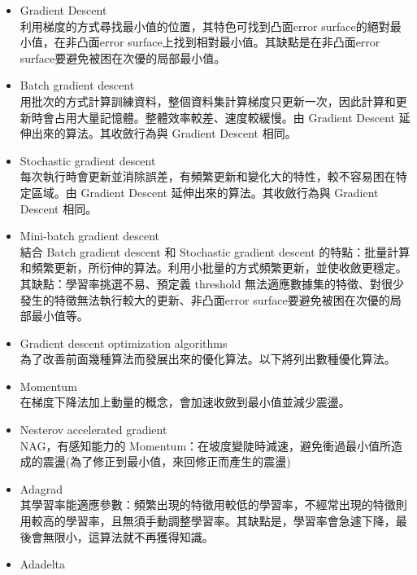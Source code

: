 \documentclass[14pt,a4paper]{report}  %
\begin{document}
\begin{itemize}
\item Gradient Descent\\[6pt]
利用梯度的方式尋找最小值的位置，其特色可找到凸面error surface的絕對最小值，在非凸面error surface上找到相對最小值。其缺點是在非凸面error surface要避免被困在次優的局部最小值。\\
\item Batch gradient descent\\[6pt]
用批次的方式計算訓練資料，整個資料集計算梯度只更新一次，因此計算和更新時會占用大量記憶體。整體效率較差、速度較緩慢。由 Gradient Descent 延伸出來的算法。其收斂行為與 Gradient Descent 相同。\\
\item Stochastic gradient descent\\[6pt]
每次執行時會更新並消除誤差，有頻繁更新和變化大的特性，較不容易困在特定區域。由 Gradient Descent 延伸出來的算法。其收斂行為與 Gradient Descent 相同。\\
\item Mini-batch gradient descent\\[6pt]
結合 Batch gradient descent 和 Stochastic gradient descent 的特點：批量計算和頻繁更新，所衍伸的算法。利用小批量的方式頻繁更新，並使收斂更穩定。其缺點：學習率挑選不易、預定義 threshold 無法適應數據集的特徵、對很少發生的特徵無法執行較大的更新、非凸面error surface要避免被困在次優的局部最小值等。\\
\item Gradient descent optimization algorithms\\[6pt]
為了改善前面幾種算法而發展出來的優化算法。以下將列出數種優化算法。\\
\item Momentum\\[6pt]
在梯度下降法加上動量的概念，會加速收斂到最小值並減少震盪。\\
\item Nesterov accelerated gradient\\[6pt]
NAG，有感知能力的 Momentum：在坡度變陡時減速，避免衝過最小值所造成的震盪(為了修正到最小值，來回修正而產生的震盪)\\
\item Adagrad\\[6pt]
其學習率能適應參數：頻繁出現的特徵用較低的學習率，不經常出現的特徵則用較高的學習率，且無須手動調整學習率。其缺點是，學習率會急遽下降，最後會無限小，這算法就不再獲得知識。\\
\item Adadelta\\[6pt]

\end{itemize}
\end{document}
